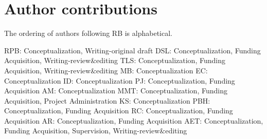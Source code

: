 \documentclass[12pt,]{article}
\begin{document}
\hypertarget{author-contributions}{%
\section{Author contributions}\label{author-contributions}}

The ordering of authors following RB is alphabetical.

RPB: Conceptualization, Writing-original draft DSL: Conceptualization,
Funding Acquisition, Writing-review\&editing TLS: Conceptualization,
Funding Acquisition, Writing-review\&editing MB: Conceptualization EC:
Conceptualization ID: Conceptualization PJ: Conceptualization, Funding
Acquisition AM: Conceptualization MMT: Conceptualization, Funding
Acquisition, Project Administration KS: Conceptualization PBH:
Conceptualization, Funding Acquisition RC: Conceptualization, Funding
Acquisition AR: Conceptualization, Funding Acquisition AET:
Conceptualization, Funding Acquisition, Supervision,
Writing-review\&editing

\renewcommand\refname{References}

\end{document}
